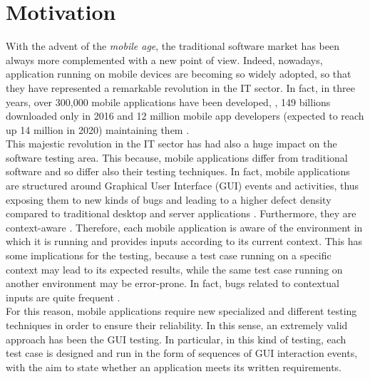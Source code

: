 \section{Motivation}
With the advent of the \textit{mobile age}, the traditional software market has been always more complemented with a new point of view. Indeed, nowadays, application running on mobile devices are becoming so widely adopted, so that they have represented a remarkable revolution in the IT sector. In fact, in three years, over 300,000 mobile applications have been developed, \cite{muccini}, 149 billions downloaded only in 2016 \cite{statista} and 12 million mobile app developers (expected to reach up 14 million in 2020) maintaining them \cite{DevRelate}. \\
This majestic revolution in the IT sector has had also a huge impact on the software testing area. This because, mobile applications differ from traditional software and so differ also their testing techniques. 
In fact, mobile applications are structured around Graphical User Interface (GUI) events and activities, thus exposing them to new kinds of bugs and leading to a higher defect density compared to traditional desktop and server applications \cite{Hu:2011:AGT:1982595.1982612}. Furthermore, they are context-aware \cite{muccini}. 
Therefore, each mobile application is aware of the environment in which it is running and provides inputs according to its current context. This has some implications for the testing, because a test case running on a specific context may lead to its expected results, while the same test case running on another environment may be error-prone. In fact, bugs related to contextual inputs are quite frequent \cite{muccini}. \\
For this reason, mobile applications require new specialized and different testing techniques \cite{muccini} in order to ensure their reliability. In this sense, an extremely valid approach has been the GUI testing. In particular, in this kind of testing, each test case is designed and run in the form of sequences of GUI interaction events, with the aim to state whether an application meets its written requirements. 

